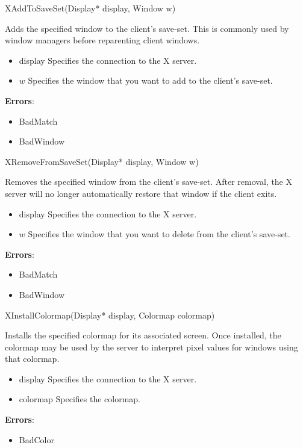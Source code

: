 \documentclass{report}
\begin{document}
\begin{itemize}
        \begin{cppcode}
        XAddToSaveSet(Display* display, Window w)
        \end{cppcode}
        \bigbreak \noindent
        Adds the specified window to the client’s save-set. This is commonly used by window managers before reparenting client windows.
        \begin{itemize}
            \item display Specifies the connection to the X server.
            \item $w$ Specifies the window that you want to add to the client’s save-set.
        \end{itemize}
        \bigbreak \noindent
        \textbf{Errors}:
        \begin{itemize}
            \item BadMatch
            \item BadWindow
        \end{itemize}

        \begin{cppcode}
        XRemoveFromSaveSet(Display* display, Window w)
        \end{cppcode}
        \bigbreak \noindent
        Removes the specified window from the client’s save-set. After removal, the X server will no longer automatically restore that window if the client exits.
        \begin{itemize}
            \item display Specifies the connection to the X server.
            \item $w$ Specifies the window that you want to delete from the client’s save-set.
        \end{itemize}
        \bigbreak \noindent
        \textbf{Errors}:
        \begin{itemize}
            \item BadMatch
            \item BadWindow
        \end{itemize}

        \begin{cppcode}
            XInstallColormap(Display* display, Colormap colormap)
        \end{cppcode}
        \bigbreak \noindent
        Installs the specified colormap for its associated screen. Once installed, the colormap may be used by the server to interpret pixel values for windows using that colormap.
        \begin{itemize}
            \item display Specifies the connection to the X server.
            \item colormap Specifies the colormap.
        \end{itemize}
        \bigbreak \noindent
        \textbf{Errors}:
        \begin{itemize}
            \item BadColor
        \end{itemize}


\end{itemize}
\end{document}
